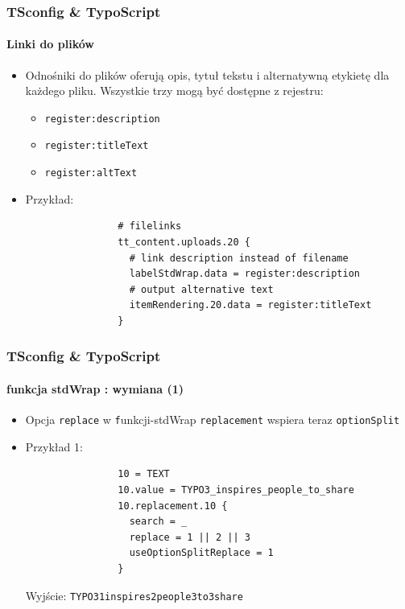 \begin{frame}[fragile]
	\frametitle{TSconfig \& TypoScript}
	\framesubtitle{Linki do plików}

	\begin{itemize}
		\item Odnośniki do plików oferują opis, tytuł tekstu i alternatywną etykietę dla każdego pliku.
			Wszystkie trzy mogą być dostępne z rejestru:

			\begin{itemize}
				\item \texttt{register:description}
				\item \texttt{register:titleText}
				\item \texttt{register:altText}
			\end{itemize}

		\item Przykład:

			\begin{lstlisting}
				# filelinks
				tt_content.uploads.20 {
				  # link description instead of filename
				  labelStdWrap.data = register:description
				  # output alternative text
				  itemRendering.20.data = register:titleText
				}
			\end{lstlisting}

	\end{itemize}

\end{frame}


\begin{frame}[fragile]
	\frametitle{TSconfig \& TypoScript}
	\framesubtitle{funkcja stdWrap : wymiana (1)}

	\begin{itemize}
		\item Opcja \texttt{replace} w \texttt funkcji-{stdWrap} \texttt{replacement}\newline
			wspiera teraz \texttt{optionSplit}

		\item Przykład 1:

			\begin{lstlisting}
				10 = TEXT
				10.value = TYPO3_inspires_people_to_share
				10.replacement.10 {
				  search = _
				  replace = 1 || 2 || 3
				  useOptionSplitReplace = 1
				}
			\end{lstlisting}

			Wyjście:\newline
				\texttt{TYPO31inspires2people3to3share}

	\end{itemize}

\end{frame}

